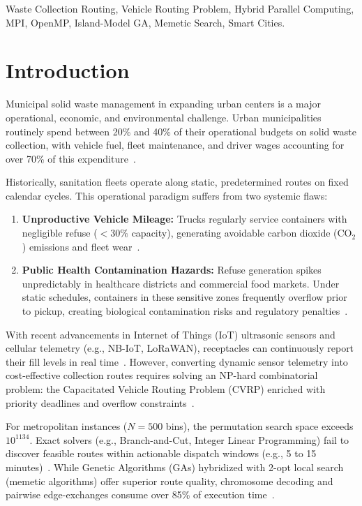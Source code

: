 \documentclass[conference]{IEEEtran}
\begin{document}
\begin{IEEEkeywords}
Waste Collection Routing, Vehicle Routing Problem, Hybrid Parallel Computing, MPI, OpenMP, Island-Model GA, Memetic Search, Smart Cities.
\end{IEEEkeywords}

\section{Introduction}
Municipal solid waste management in expanding urban centers is a major operational, economic, and environmental challenge. Urban municipalities routinely spend between 20\% and 40\% of their operational budgets on solid waste collection, with vehicle fuel, fleet maintenance, and driver wages accounting for over 70\% of this expenditure~\cite{hannan2018capacitated, hannan2020solid}. 

Historically, sanitation fleets operate along static, predetermined routes on fixed calendar cycles. This operational paradigm suffers from two systemic flaws:
\begin{enumerate}
    \item \textbf{Unproductive Vehicle Mileage:} Trucks regularly service containers with negligible refuse ($<30\%$ capacity), generating avoidable carbon dioxide ($\text{CO}_2$) emissions and fleet wear~\cite{hannan2018capacitated, erdogan2012green}.
    \item \textbf{Public Health Contamination Hazards:} Refuse generation spikes unpredictably in healthcare districts and commercial food markets. Under static schedules, containers in these sensitive zones frequently overflow prior to pickup, creating biological contamination risks and regulatory penalties~\cite{tirkolaee2021sustainable, tirkolaee2023novel}.
\end{enumerate}

With recent advancements in Internet of Things (IoT) ultrasonic sensors and cellular telemetry (e.g., NB-IoT, LoRaWAN), receptacles can continuously report their fill levels in real time~\cite{banyai2019optimization, bouleft2023dynamic}. However, converting dynamic sensor telemetry into cost-effective collection routes requires solving an NP-hard combinatorial problem: the Capacitated Vehicle Routing Problem (CVRP) enriched with priority deadlines and overflow constraints~\cite{tirkolaee2023novel, vidal2014hybrid}.

For metropolitan instances ($N=500$ bins), the permutation search space exceeds $10^{1134}$. Exact solvers (e.g., Branch-and-Cut, Integer Linear Programming) fail to discover feasible routes within actionable dispatch windows (e.g., 5 to 15 minutes)~\cite{hannan2020solid}. While Genetic Algorithms (GAs) hybridized with 2-opt local search (memetic algorithms) offer superior route quality, chromosome decoding and pairwise edge-exchanges consume over 85\% of execution time~\cite{vidal2014hybrid}. 
\end{document}
